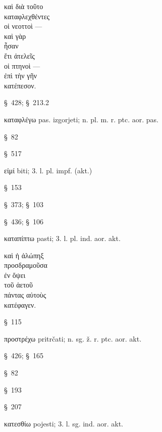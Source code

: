

{\large
\begin{greek}
\noindent καὶ διὰ τοῦτο \\
καταφλεχθέντες \\
οἱ νεοττοὶ —\\
καὶ γὰρ \\
\tabto{2em} ἦσαν \\
\tabto{4em} ἔτι ἀτελεῖς \\
\tabto{2em} οἱ πτηνοὶ —\\
ἐπὶ τὴν γῆν \\
κατέπεσον. \\

\end{greek}
}

\begin{description}[noitemsep]
\item[διὰ τοῦτο ] §~428; §~213.2
\item[καταφλεχθέντες ] καταφλέγω pas. izgorjeti; n. pl. m. r. ptc. aor. pas.
\item[οἱ νεοττοὶ] §~82
\item[καὶ γὰρ ] §~517
\item[ἦσαν] εἰμί biti; 3. l. pl. impf. (akt.)
\item[ἀτελεῖς ] §~153
\item[οἱ πτηνοὶ] §~373; §~103
\item[ἐπὶ τὴν γῆν] §~436; §~106
\item[κατέπεσον] καταπίπτω pasti; 3. l. pl. ind. aor. akt.

\end{description}


{\large
\begin{greek}
\noindent καὶ ἡ ἀλώπηξ \\
\tabto{2em} προσδραμοῦσα \\
\tabto{2em} ἐν ὄψει \\
\tabto{4em} τοῦ ἀετοῦ \\
πάντας αὐτοὺς \\
κατέφαγεν.\\

\end{greek}
}

\begin{description}[noitemsep]
\item[ἡ ἀλώπηξ ] §~115
\item[προσδραμοῦσα ] προστρέχω pritrčati; n. sg. ž. r. ptc. aor. akt.
\item[ἐν ὄψει ] §~426; §~165
\item[τοῦ ἀετοῦ ] §~82
\item[πάντας ] §~193
\item[αὐτοὺς ] §~207
\item[κατέφαγεν] κατεσθίω pojesti; 3. l. sg. ind. aor. akt.

\end{description}

